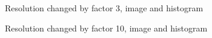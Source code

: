 \documentclass[a4paper, 10pt, final]{article}
\begin{document}
\begin{figure}[!h]
\centering
{}
\caption{Resolution changed by factor 3, image and histogram}
\label{fig:resolutionFactor3}
\end{figure}

\begin{figure}[!h]
\centering
{}
\caption{Resolution changed by factor 10, image and histogram}
\label{fig:resolutionFactor10}
\end{figure}





\end{document}
